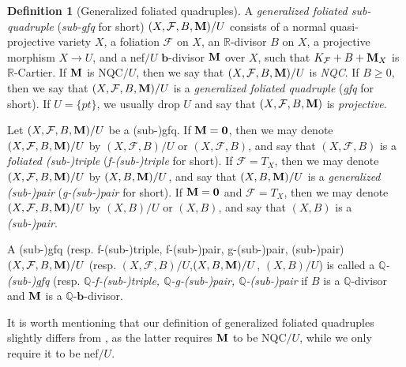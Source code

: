 \documentclass[11pt]{amsart}
\numberwithin{equation}{section}
\newcommand{\bb}{\bm{b}}
\newcommand{\Mm}{{\bf{M}}}
\newcommand{\Rr}{\mathbb{R}}
\newcommand{\Ff}{\mathcal{F}}
\theoremstyle{definition}
\newtheorem{defn}[thm]{Definition}
\theoremstyle{definition}
\theoremstyle{definition}
\begin{document}
\begin{defn}[Generalized foliated quadruples]\label{defn: gfq}
A \emph{generalized foliated sub-quadruple} (\emph{sub-gfq} for short) $(X,\Ff,B,\Mm)/U$ consists of a normal quasi-projective variety $X$, a foliation $\Ff$ on $X$, an $\Rr$-divisor $B$ on $X$, a projective morphism $X\rightarrow U$, and a nef$/U$ $\bb$-divisor $\Mm$ over $X$, such that $K_{\Ff}+B+\Mm_X$ is $\mathbb R$-Cartier. If $\Mm$ is NQC$/U$, then we say that $(X,\Ff,B,\Mm)/U$ is \emph{NQC}. If $B\geq 0$, then we say that $(X,\Ff,B,\Mm)/U$ is a \emph{generalized foliated quadruple} (\emph{gfq} for short). If $U=\{pt\}$, we usually drop $U$ and say that $(X,\Ff,B,\Mm)$ is \emph{projective}. 

Let $(X,\Ff,B,\Mm)/U$ be a (sub-)gfq. If $\Mm=\bm{0}$, then we may denote $(X,\Ff,B,\Mm)/U$ by $(X,\Ff,B)/U$ or $(X,\Ff,B)$, and say that $(X,\Ff,B)$ is a \emph{foliated (sub-)triple} (\emph{f-(sub-)triple} for short). If $\Ff=T_X$, then we may denote $(X,\Ff,B,\Mm)/U$ by $(X,B,\Mm)/U$, and say that $(X,B,\Mm)/U$ is a \emph{generalized (sub-)pair} (\emph{g-(sub-)pair} for short). If $\Mm=\bm{0}$ and $\Ff=T_X$, then we may denote $(X,\Ff,B,\Mm)/U$ by $(X,B)/U$ or $(X,B)$, and say that $(X,B)$ is a \emph{(sub-)pair}. 

A (sub-)gfq (resp. f-(sub-)triple, f-(sub-)pair, g-(sub-)pair, (sub-)pair) $(X,\Ff,B,\Mm)/U$ (resp. $(X,\Ff,B)/U$,$(X,B,\Mm)/U$, $(X,B)/U$) is called a \emph{$\mathbb Q$-(sub-)gfq} (resp. \emph{$\mathbb Q$-f-(sub-)triple, $\mathbb Q$-g-(sub-)pair, $\mathbb Q$-(sub-)pair} if $B$ is a $\mathbb Q$-divisor and $\Mm$ is a $\mathbb Q$-$\bb$-divisor.

It is worth mentioning that our definition of generalized foliated quadruples slightly differs from \cite[Definition 1.2]{LLM23}, as the latter requires $\Mm$ to be NQC$/U$,  while we only require it to be nef$/U$.
\end{defn}
\end{document}
